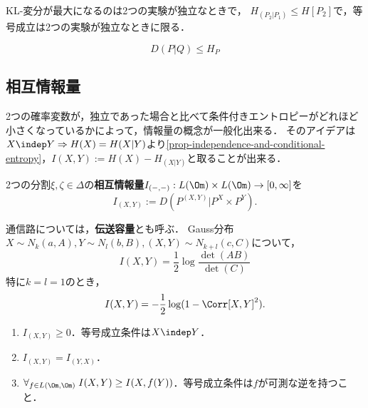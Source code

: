 \documentclass[uplatex,dvipdfmx]{jsreport}
\begin{document}
\begin{tcolorbox}[colframe=ForestGreen, colback=ForestGreen!10!white,breakable,colbacktitle=ForestGreen!40!white,coltitle=black,fonttitle=\bfseries\sffamily,
title=]
    KL-変分が最大になるのは2つの実験が独立なときで，
    $H_{(P_2|P_1)}\le H[P_2]$で，等号成立は2つの実験が独立なときに限る．
\end{tcolorbox}

\begin{definition}[条件付き相対エントロピー]
    
\end{definition}

\begin{proposition}
    \[D(P|Q)\le H_P\]
\end{proposition}

\subsection{相互情報量}

\begin{tcolorbox}[colframe=ForestGreen, colback=ForestGreen!10!white,breakable,colbacktitle=ForestGreen!40!white,coltitle=black,fonttitle=\bfseries\sffamily,
title=]
    2つの確率変数が，独立であった場合と比べて条件付きエントロピーがどれほど小さくなっているかによって，情報量の概念が一般化出来る．
    そのアイデアは$X\indep Y\Rightarrow H(X)=H{(X|Y)}$より\ref{prop-independence-and-conditional-entropy}，$I(X,Y):=H(X)-H_{(X|Y)}$と取ることが出来る．
\end{tcolorbox}

\begin{definition}
    2つの分割$\xi,\zeta\in\Delta$の\textbf{相互情報量}$I_{(-,-)}:L(\Om)\times L(\Om)\to[0,\infty]$を
    \[I_{(X,Y)}:=D(P^{(X,Y)}|P^X\times P^Y).\]
\end{definition}
\begin{remarks}
    通信路については，\textbf{伝送容量}とも呼ぶ．
    Gauss分布$X\sim N_k(a,A),Y\sim N_l(b,B),(X,Y)\sim N_{k+l}(c,C)$について，
    \[I(X,Y)=\frac{1}{2}\log\frac{\det(AB)}{\det{(C)}}\]
    特に$k=l=1$のとき，
    \[I(X,Y)=-\frac{1}{2}\log(1-\Corr[X,Y]^2).\]
\end{remarks}

\begin{proposition}\mbox{}
    \begin{enumerate}
        \item $I_{(X,Y)}\ge0$．等号成立条件は$X\indep Y$．
        \item $I_{(X,Y)}=I_{(Y,X)}$．
        \item $\forall_{f\in L(\Om,\Om)}\;I(X,Y)\ge I(X,f(Y))$．等号成立条件は$f$が可測な逆を持つこと．
    \end{enumerate}
\end{proposition}
\end{document}
